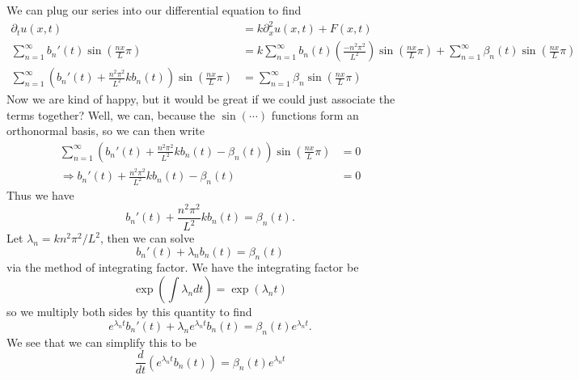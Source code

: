 \begin{ex}
We can plug our series into our differential equation to
find
\begin{subequations}
\begin{align}
\partial_{t}u(x,t) &= k\partial^{2}_{x}u(x,t)+F(x,t)\\
\sum^{\infty}_{n=1}
b_{n}'(t)\sin\left(\frac{nx}{L}\pi\right) &= k
\sum^{\infty}_{n=1}b_{n}(t)\left(\frac{-n^2\pi^2}{L^2}\right)\sin\left(\frac{nx}{L}\pi\right)+ \sum^{\infty}_{n=1}\beta_{n}(t)\sin\left(\frac{nx}{L}\pi\right)\\
\sum^{\infty}_{n=1}\left(b_{n}'(t) + \frac{n^2\pi^2}{L^2}kb_{n}(t)\right)\sin\left(\frac{nx}{L}\pi\right)
&= \sum^{\infty}_{n=1}\beta_{n}\sin\left(\frac{nx}{L}\pi\right)
\end{align}
\end{subequations}
Now we are kind of happy, but it would be great if we could
just associate the terms together? Well, we can, because the
$\sin(\cdots)$ functions form an orthonormal basis, so we
can then write
\begin{subequations}
\begin{align}
\sum^{\infty}_{n=1}\left(b_{n}'(t) + \frac{n^2\pi^2}{L^2}kb_{n}(t) - \beta_{n}(t)\right)\sin\left(\frac{nx}{L}\pi\right)&=0\\
\Rightarrow b_{n}'(t) + \frac{n^2\pi^2}{L^2}kb_{n}(t) -
\beta_{n}(t) &=0
\end{align}
\end{subequations}
Thus we have
\begin{equation}
b_{n}'(t) + \frac{n^2\pi^2}{L^2}kb_{n}(t) = \beta_{n}(t).
\end{equation}
Let $\lambda_{n} = kn^2\pi^2/L^2$, then we can solve
\begin{equation}
b_{n}'(t) + \lambda_{n}b_{n}(t) = \beta_{n}(t)
\end{equation}
via the method of integrating factor. We have the
integrating factor be
\begin{equation}
\exp(\int\lambda_ndt)=\exp(\lambda_nt)
\end{equation}
so we multiply both sides by this quantity to find
\begin{equation}
e^{\lambda_nt}b_{n}'(t) + \lambda_{n}e^{\lambda_nt}b_{n}(t)
= \beta_{n}(t)e^{\lambda_nt}.
\end{equation}
We see that we can simplify this to be
\begin{equation}
\frac{d}{dt}(e^{\lambda_nt}b_{n}(t)) =
\beta_{n}(t)e^{\lambda_nt}
\end{equation}

\end{ex}
